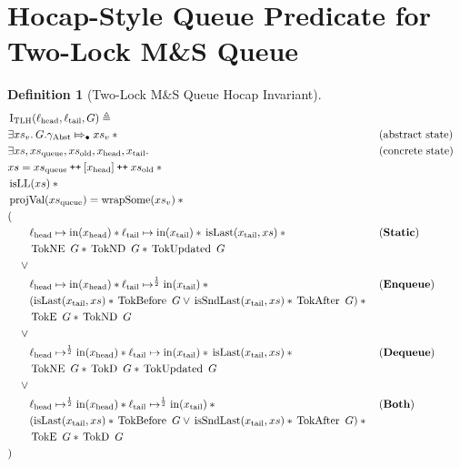 \documentclass[a4paper, 10pt]{report}
\theoremstyle{definition}
\newtheorem{definition}{Definition}[section]
\newcommand{\msq}{M\&S Queue}
\newcommand{\tlmsq}{Two-Lock \msq{}}
\newcommand{\TLQueueInvariantHocap}{\operatorname{I_{TLH}}}
\newcommand{\xsc}{xs}
\newcommand{\xsqueue}{xs_{\mathrm{queue}}}
\newcommand{\xsold}{xs_{\mathrm{old}}}
\newcommand{\isLL}{\operatorname{isLL}}
\newcommand{\projval}{\operatorname{projVal}}
\newcommand{\wrapsome}{\operatorname{wrapSome}}
\newcommand{\isLast}{\operatorname{isLast}}
\newcommand{\isSndLast}{\operatorname{isSndLast}}
\newcommand{\locN}[1]{\loc_{\mathrm{#1}}}
\newcommand{\lochead}{\locN{head}}
\newcommand{\loctail}{\locN{tail}}
\newcommand{\nIn}[1]{\operatorname{in}(#1)}
\newcommand{\node}{x}
\newcommand{\nodeN}[1]{\node_{\mathrm{#1}}}
\newcommand{\nodehead}{\nodeN{head}}
\newcommand{\nodetail}{\nodeN{tail}}
\newcommand{\absvalueList}{xs_v}
\newcommand{\StaticState}{\textbf{Static}\xspace}
\newcommand{\EnqueueState}{\textbf{Enqueue}\xspace}
\newcommand{\DequeueState}{\textbf{Dequeue}\xspace}
\newcommand{\BothState}{\textbf{Both}\xspace}
\newcommand{\Qg}{G}
\newcommand{\gabst}{\gname_{\mathrm{Abst}}}
\newcommand{\TokE}[1]{\operatorname{TokE} ~ #1}
\newcommand{\TokEQg}{\TokE{\Qg}}
\newcommand{\TokNE}[1]{\operatorname{TokNE} ~ #1}
\newcommand{\TokNEQg}{\TokNE{\Qg}}
\newcommand{\TokD}[1]{\operatorname{TokD} ~ #1}
\newcommand{\TokDQg}{\TokD{\Qg}}
\newcommand{\TokND}[1]{\operatorname{TokND} ~ #1}
\newcommand{\TokNDQg}{\TokND{\Qg}}
\newcommand{\TokBefore}[1]{\operatorname{TokBefore} ~ #1}
\newcommand{\TokBeforeQg}{\TokBefore{\Qg}}
\newcommand{\TokAfter}[1]{\operatorname{TokAfter} ~ #1}
\newcommand{\TokAfterQg}{\TokAfter{\Qg}}
\newcommand{\TokUpdated}[1]{\operatorname{TokUpdated} ~ #1}
\newcommand{\TokUpdatedQg}{\TokUpdated{\Qg}}
\newcommand\catenate{\mathbin{\text{\ttfamily\upshape ++}}}
\newcommand{\abstractstateauth}[2]{#1 \Mapsto_{\bullet} #2}
\begin{document}
\section{Hocap-Style Queue Predicate for \tlmsq{}}\label{appendix:predicates:section:hocapqueuepred}
\begin{definition}[\tlmsq{} Hocap Invariant]\label{TLMSQ:spec:hocap:invariant}
  \begin{align*}
    &\TLQueueInvariantHocap(\lochead, \loctail, \Qg) \eqdef\\
    &\Exists \absvalueList. \abstractstateauth{\Qg.\gabst}{\absvalueList} \star{} &&\text{(abstract state)}\\
    &\Exists \xsc, \xsqueue, \xsold, \nodehead, \nodetail . &&\text{(concrete state)}\\
    &\xsc = \xsqueue \catenate [\nodehead] \catenate \xsold \star{}\\
    &\isLL(\xsc) \star{}\\
    &\projval(\xsqueue) = \wrapsome(\absvalueList) \star{}\\
    &(\\
    &\quad\quad\lochead \mapsto \nIn{\nodehead} \star{} \loctail \mapsto \nIn{\nodetail} \star{} \isLast(\nodetail, \xsc) \star{} &&\text{(\StaticState)}\\
    &\quad\quad \TokNEQg \star{} \TokNDQg \star{} \TokUpdatedQg\\
    &\quad\lor{}\\
    &\quad\quad\lochead \mapsto \nIn{\nodehead} \star{} \loctail \mapsto^{\frac{1}{2}} \nIn{\nodetail} \star{} &&\text{(\EnqueueState)}\\
    &\quad\quad (\isLast(\nodetail, \xsc) \star{} \TokBeforeQg \lor{} \isSndLast(\nodetail, \xsc) \star{} \TokAfterQg) \star{}\\
    &\quad\quad \TokEQg \star{} \TokNDQg\\
    &\quad\lor{}\\
    &\quad\quad\lochead \mapsto^{\frac{1}{2}} \nIn{\nodehead} \star{} \loctail \mapsto \nIn{\nodetail} \star{} \isLast(\nodetail, \xsc) \star{} &&\text{(\DequeueState)}\\
    &\quad\quad \TokNEQg \star{} \TokDQg \star{} \TokUpdatedQg\\
    &\quad\lor{}\\
    &\quad\quad\lochead \mapsto^{\frac{1}{2}} \nIn{\nodehead} \star{} \loctail \mapsto^{\frac{1}{2}} \nIn{\nodetail} \star{} &&\text{(\BothState)}\\
    &\quad\quad (\isLast(\nodetail, \xsc) \star{} \TokBeforeQg \lor{} \isSndLast(\nodetail, \xsc) \star{} \TokAfterQg) \star{} \\
    &\quad\quad \TokEQg \star{} \TokDQg\\
    &)
  \end{align*}
\end{definition}
\end{document}
